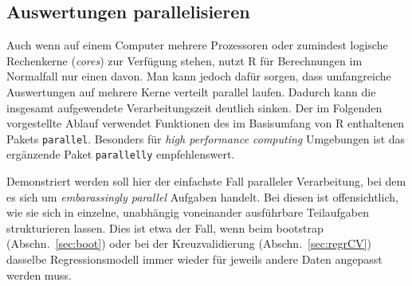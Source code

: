 \subsection{Auswertungen parallelisieren}
\label{sec:parallel}


Auch wenn auf einem Computer mehrere Prozessoren oder zumindest logische Rechenkerne (\emph{cores}) zur Verfügung stehen, nutzt R für Berechnungen im Normalfall nur einen davon. Man kann jedoch dafür sorgen, dass umfangreiche Auswertungen auf mehrere Kerne verteilt parallel laufen. Dadurch kann die insgesamt aufgewendete Verarbeitungszeit deutlich sinken. Der im Folgenden vorgestellte Ablauf verwendet Funktionen des im Basisumfang von R enthaltenen Pakets \lstinline!parallel!. Besonders für \emph{high performance computing} Umgebungen ist das ergänzende Paket \lstinline!parallelly! \cite{Bengtsson2024} empfehlenswert.

Demonstriert werden soll hier der einfachste Fall paralleler Verarbeitung, bei dem es sich um \emph{embarassingly parallel} Aufgaben handelt. Bei diesen ist offensichtlich, wie sie sich in einzelne, unabhängig voneinander ausführbare Teilaufgaben strukturieren lassen. Dies ist etwa der Fall, wenn beim bootstrap (Abschn.\ \ref{sec:boot}) oder bei der Kreuzvalidierung (Abschn.\ \ref{sec:regrCV}) dasselbe Regressionsmodell immer wieder für jeweils andere Daten angepasst werden muss.

